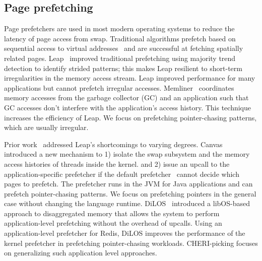\subsection{Page prefetching}
Page prefetchers are used in most modern operating systems to reduce the latency of page access from swap. 
Traditional algorithms prefetch based on sequential access to virtual addresses~\cite{vma-readahead, vm_fault_readahead} and are successful at fetching spatially related pages. 
Leap~\cite{leap} improved traditional prefetching using majority trend detection to identify strided patterns; this makes Leap resilient to short-term irregularities in the memory access stream.
Leap improved performance for many applications but cannot prefetch irregular accesses. 
Memliner~\cite{memliner} coordinates memory accesses from the garbage collector (GC) and an application such that GC accesses don't interfere with the application's access history. This technique increases the efficiency of Leap. We focus on prefetching pointer-chasing patterns, which are usually irregular.

Prior work~\cite{dilos, canvas} addressed Leap's shortcomings to varying degrees. Canvas~\cite{canvas} introduced a new mechanism to 1) isolate the swap subsystem and the memory access histories of threads inside the kernel. and 2) issue an upcall to the application-specific prefetcher if the default prefetcher~\cite{vma-readahead} cannot decide which pages to prefetch. The prefetcher runs in the JVM for Java applications and can prefetch pointer-chasing patterns. We focus on prefetching pointers in the general case without changing the language runtime.  DiLOS~\cite{dilos} introduced a libOS-based approach to disaggregated memory that allows the system to perform application-level prefetching without the overhead of upcalls. Using an application-level prefetcher for Redis, DiLOS improves the performance of the kernel prefetcher in prefetching pointer-chasing workloads. CHERI-picking focuses on generalizing such application level approaches.


